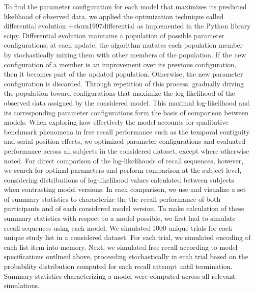 {}\markdownRendererInterblockSeparator
{}To find the parameter configuration for each model that maximizes its predicted likelihood of observed data, we applied the optimization technique called differential evolution +{}{}{storn1997differential} as implemented in the Python library scipy. Differential evolution maintains a population of possible parameter configurations; at each update, the algorithm mutates each population member by stochastically mixing them with other members of the population. If the new configuration of a member is an improvement over its previous configuration, then it becomes part of the updated population. Otherwise, the new parameter configuration is discarded. Through repetition of this process, gradually driving the population toward configurations that maximize the log-likelihood of the observed data assigned by the considered model. This maximal log-likelihood and its corresponding parameter configurations form the basis of comparison between models.\markdownRendererInterblockSeparator
{}When exploring how effectively the model accounts for qualitative benchmark phenomena in free recall performance such as the temporal contiguity and serial position effects, we optimized parameter configurations and evaluated performance across all subjects in the considered dataset, except where otherwise noted. For direct comparison of the log-likelihoods of recall sequences, however, we search for optimal parameters and perform comparison at the subject level, considering distributions of log-likelihood values calculated between subjects when contrasting model versions.\markdownRendererInterblockSeparator
{}\markdownRendererInterblockSeparator
{}In each comparison, we use and visualize a set of summary statistics to characterize the the recall performance of both participants and of each considered model version. To make calculation of these summary statistics with respect to a model possible, we first had to simulate recall sequences using each model. We simulated 1000 unique trials for each unique study list in a considered dataset. For each trial, we simulated encoding of each list item into memory. Next, we simulated free recall according to model specifications outlined above, proceeding stochastically in ecah trial based on the probability distribution computed for each recall attempt until termination. Summary statistics characterizing a model were computed across all relevant simulations.\markdownRendererInterblockSeparator
